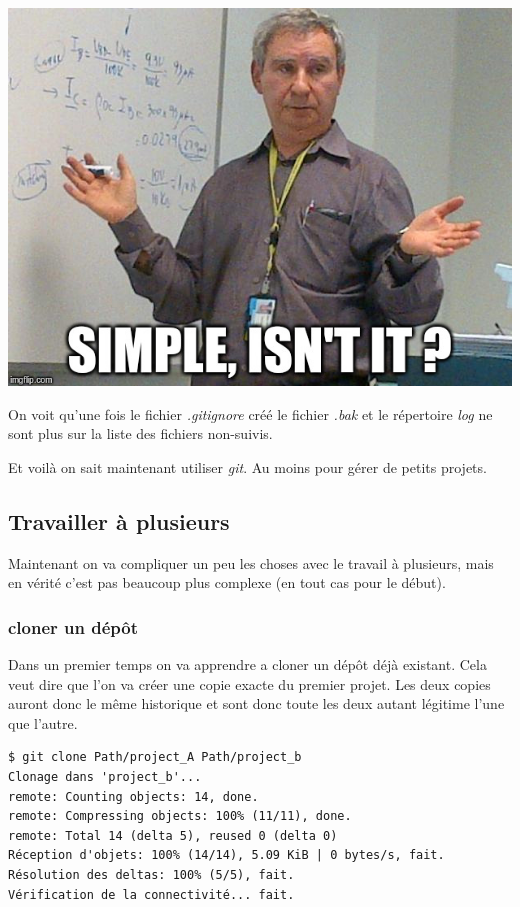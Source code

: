 \documentclass[12pt,a4paper]{article}
\begin{document}
\begin{minipage}{0.25\linewidth}
\includegraphics[width=\linewidth]{simple}
\end{minipage}\hfill
\begin{minipage}{0.7\linewidth}
On voit qu'une fois le fichier \emph{.gitignore} créé le fichier \emph{.bak} et le répertoire \emph{log} ne sont plus sur la liste des fichiers non-suivis.

Et voilà on sait maintenant utiliser \emph{git}. Au moins pour gérer de petits projets.
\end{minipage}

\subsection{Travailler à plusieurs}

Maintenant on va compliquer un peu les choses avec le travail à plusieurs, mais en vérité c'est pas beaucoup plus complexe (en tout cas pour le début).

\subsubsection{cloner un dépôt}

Dans un premier temps on va apprendre a cloner un dépôt déjà existant. Cela veut dire que l'on va créer une copie exacte du premier projet. Les deux copies auront donc le même historique et sont donc toute les deux autant légitime l'une que l'autre.

\begin{verbatim}
$ git clone Path/project_A Path/project_b
Clonage dans 'project_b'...
remote: Counting objects: 14, done.
remote: Compressing objects: 100% (11/11), done.
remote: Total 14 (delta 5), reused 0 (delta 0)
Réception d'objets: 100% (14/14), 5.09 KiB | 0 bytes/s, fait.
Résolution des deltas: 100% (5/5), fait.
Vérification de la connectivité... fait.
\end{verbatim}
\end{document}

